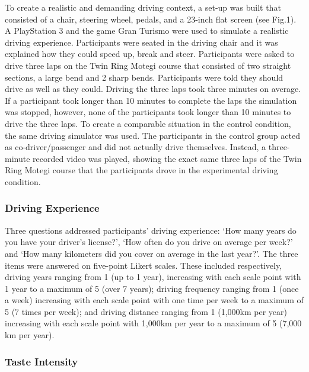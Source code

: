 \documentclass[authordate, empirical]{jote-new-article}
\begin{document}
To create a realistic and demanding driving context, a set-up was built that consisted of a chair, steering wheel, pedals, and a 23-inch flat screen (see Fig.1). A PlayStation 3 and the game Gran Turismo \parencites{Yamauchi2013} were used to simulate a realistic driving experience. Participants were seated in the driving chair and it was explained how they could speed up, break and steer. Participants were asked to drive three laps on the Twin Ring Motegi course that consisted of two straight sections, a large bend and 2 sharp bends. Participants were told they should drive as well as they could. Driving the three laps took three minutes on average. If a participant took longer than 10 minutes to complete the laps the simulation was stopped, however, none of the participants took longer than 10 minutes to drive the three laps. To create a comparable situation in the control condition, the same driving simulator was used. The participants in the control group acted as co-driver/passenger and did not actually drive themselves. Instead, a three-minute recorded video was played, showing the exact same three laps of the Twin Ring Motegi course that the participants drove in the experimental driving condition.











\subsubsection{Driving Experience}



Three questions addressed participants’ driving experience: ‘How many years do you have your driver’s license?’, ‘How often do you drive on average per week?’ and ‘How many kilometers did you cover on average in the last year?’. The three items were answered on five-point Likert scales. These included respectively, driving years ranging from 1 (up to 1 year), increasing with each scale point with 1 year to a maximum of 5 (over 7 years); driving frequency ranging from 1 (once a week) increasing with each scale point with one time per week to a maximum of 5 (7 times per week); and driving distance ranging from 1 (1,000km per year) increasing with each scale point with 1,000km per year to a maximum of 5 (7,000 km per year).



\subsubsection{Taste Intensity}
\end{document}
